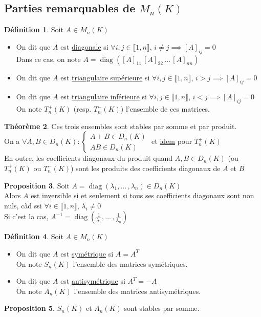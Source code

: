 \documentclass[10pt,a4paper]{article}
\theoremstyle{definition}
\newtheorem{proposition}{Proposition}[section]
\newtheorem{theorem}[proposition]{Théorème}
\newtheorem{definition}[proposition]{Définition}
\DeclareMathOperator{\diag}{diag}
\begin{document}
\subsection{Parties remarquables de $M_n(K)$}
\begin{definition}
Soit $A \in M_n(K)$
\begin{itemize}
\item On dit que $A$ est \uline{diagonale} si $\forall i, j \in \llbracket 1, n \rrbracket$, $i \neq j \implies [A]_{ij} = 0 $ \\
Dans ce cas, on note $A = \diag([A]_{11} \, [A]_{22} \, ... \, [A]_{nn})$
\item On dit que $A$ est \uline{triangulaire supérieure} si $\forall i, j \in \llbracket 1, n \rrbracket$, $i > j \implies [A]_{ij} = 0$
\item On dit que $A$ est \uline{triangulaire inférieure} si $\forall i, j \in \llbracket 1, n \rrbracket$, $i < j \implies [A]_{ij} = 0$ \\
On note $T_n^+(K)$ (resp. $T_n^-(K)$) l'ensemble de ces matrices.
\end{itemize}
\end{definition}
\begin{theorem}
Ces trois ensembles sont stables par somme et par produit. \\
On a $\forall A, B \in D_n(K): \begin{cases}
A + B \in D_n(K) \\
AB \in D_n(K)
\end{cases}$ et \uline{idem} pour $T_n^\pm(K)$ \\
En outre, les coefficients diagonaux du produit quand $A, B \in D_n(K)$ (ou $T_n^+(K)$ ou $T_n^-(K)$) sont les produits des coefficients diagonaux de $A$ et $B$
\end{theorem}
\begin{proposition}
Soit $A = \diag( \lambda_1, ...\,, \lambda_n) \in D_n(K)$ \\
Alors $A$ est inversible si et seulement si tous ses coefficients diagonaux sont non nuls, càd ssi $\forall i \in \llbracket 1, n \rrbracket$, $\lambda_i \neq 0$ \\
Si c'est la cas, $A^{-1} = \diag(\frac{1}{\lambda_1}, ...\,, \frac{1}{\lambda_n})$
\end{proposition}
\begin{definition}
Soit $A \in M_n(K)$
\begin{itemize}
\item On dit que $A$ est \uline{symétrique} si $A = A^T$ \\
On note $S_n(K)$ l'ensemble des matrices symétriques.
\item On dit que $A$ est \uline{antisymétrique} si $A^T = -A$ \\
On note $A_n(K)$ l'ensemble des matrices antisymétriques.
\end{itemize}
\end{definition}
\begin{proposition}
$S_n(K)$ et $A_n(K)$ sont stables par somme.
\end{proposition}
\end{document}
